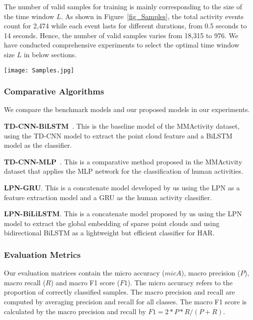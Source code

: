 The number of valid samples for training is mainly corresponding to the size of the time window $L$. 
As shown in Figure~\ref{fig_Samples}, the total activity events count for 2,474 while each event lasts for different durations, from 0.5 seconds to 14 seconds. Hence, the number of valid samples varies from 18,315 to 976. 
We have conducted comprehensive experiments to select the optimal time window size $L$ in below sections.

\begin{figure*}[ht]
    \centering
    \texttt{[image: Samples.jpg]}
    \caption{The statistics of valid samples of the discHAR and contHAR dataset. The $L$ denotes the size of the time window. With different $L$ values, the valid samples in both datasets change dramatically.}
    \label{fig_Samples}
\end{figure*}




\subsubsection{Comparative Algorithms}
\label{sec: compAlgorithoms}

We compare the benchmark models and our proposed models in our experiments. 

\textbf{TD-CNN-BiLSTM}~\cite{singh2019radhar}. This is the baseline model of the MMActivity dataset, using the TD-CNN model to extract the point cloud feature and a BiLSTM model as the classifier. 

\textbf{TD-CNN-MLP}~\cite{singh2019radhar}. This is a comparative method proposed in the MMActivity dataset that applies the MLP network for the classification of human activities. 

\textbf{LPN-GRU}. This is a concatenate model developed by us using the LPN as a feature extraction model and a GRU as the human activity classifier. 

\textbf{LPN-BiLiLSTM}. This is a concatenate model proposed by us using the LPN model to extract the global embedding of sparse point clouds and using bidirectional BiLSTM as a lightweight but efficient classifier for HAR. 

\subsubsection{Evaluation Metrics}
Our evaluation matrices contain the micro accuracy ($micA$), macro precision ($P$), macro recall ($R$) and macro F1 score ($F1$).
The micro accuracy refers to the proportion of correctly classified samples. 
The macro precision and recall are computed by averaging precision and recall for all classes. 
The macro F1 score is calculated by the macro precision and recall by $F1=2*P*R/(P+R)$. 


